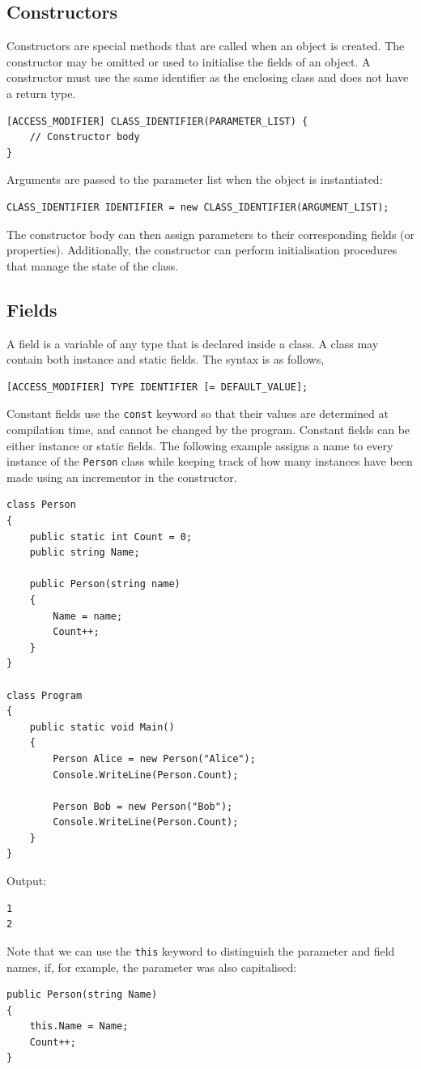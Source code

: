 \documentclass{article}
\begin{document}
\subsection{Constructors}
Constructors are special methods that are called when an object is
created. The constructor may be omitted or used to initialise the
fields of an object. A constructor must use the same identifier as the
enclosing class and does not have a return type.
\begin{verbatim}
[ACCESS_MODIFIER] CLASS_IDENTIFIER(PARAMETER_LIST) {
    // Constructor body
}
\end{verbatim}
Arguments are passed to the parameter list when the object is
instantiated:
\begin{verbatim}
CLASS_IDENTIFIER IDENTIFIER = new CLASS_IDENTIFIER(ARGUMENT_LIST);
\end{verbatim}
The constructor body can then assign parameters to their corresponding
fields (or properties). Additionally, the constructor can perform
initialisation procedures that manage the state of the class.
\subsection{Fields}
A field is a variable of any type that is declared inside a class. A
class may contain both instance and static fields. The syntax is as
follows,
\begin{verbatim}
[ACCESS_MODIFIER] TYPE IDENTIFIER [= DEFAULT_VALUE];
\end{verbatim}
Constant fields use the \texttt{const} keyword so that
their values are determined at compilation time, and cannot be changed
by the program. Constant fields can be either instance or static
fields. The following example assigns a name to every instance of the
\texttt{Person} class while keeping track of how many
instances have been made using an incrementor in the constructor.
\begin{verbatim}
class Person
{
    public static int Count = 0;
    public string Name;

    public Person(string name)
    {
        Name = name;
        Count++;
    }
}

class Program
{
    public static void Main()
    {
        Person Alice = new Person("Alice");
        Console.WriteLine(Person.Count);

        Person Bob = new Person("Bob");
        Console.WriteLine(Person.Count);
    }
}
\end{verbatim}
Output:
\begin{verbatim}
1
2
\end{verbatim}
Note that we can use the \texttt{this} keyword to
distinguish the parameter and field names, if, for example, the
parameter was also capitalised:
\begin{verbatim}
public Person(string Name)
{
    this.Name = Name;
    Count++;
}
\end{verbatim}
\end{document}
